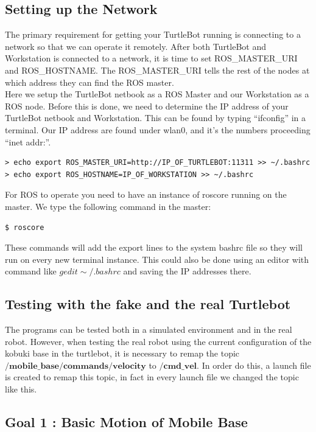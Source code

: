 \documentclass[10pt,a4paper]{article}
\begin{document}
\subsection{Setting up the Network}

The primary requirement for getting your TurtleBot running is connecting to a network so that we can operate it remotely. After both TurtleBot and Workstation is connected to a network, it is time to set ROS\_MASTER\_URI and ROS\_HOSTNAME. The ROS\_MASTER\_URI tells the rest of the nodes at which address they can find the ROS master.\\

Here we setup the TurtleBot netbook as a ROS Master and our Workstation as a ROS node. Before this is done, we need to determine the IP address of your TurtleBot netbook and Workstation. This can be found by typing ``ifconfig'' in a terminal. Our IP address are found under wlan0, and it's the numbers proceeding ``inet addr:''.

\begin{lstlisting}[frame=single] 
> echo export ROS_MASTER_URI=http://IP_OF_TURTLEBOT:11311 >> ~/.bashrc
> echo export ROS_HOSTNAME=IP_OF_WORKSTATION >> ~/.bashrc
\end{lstlisting}
For ROS to operate you need to have an instance of roscore running on the master. We type the following command in the master:

\begin{lstlisting}[frame=single] 
$ roscore
\end{lstlisting}
These commands will add the export lines to the system bashrc file so they will run on every new terminal instance. This could also be done using an editor with command like $gedit \sim/.bashrc$ and saving the IP addresses there.

\subsection{Testing with the fake and the real Turtlebot}
The programs can be tested both in a simulated environment and in the real robot. However, when testing the real robot using the current configuration of the kobuki base in the turtlebot, it is necessary to remap the topic $\textbf{/mobile\_base/commands/velocity}$ to $/\textbf{cmd\_vel}$. In order do this, a launch file is created to remap this topic, in fact in every launch file we changed the topic like this.

\subsection{Goal 1 : Basic Motion of Mobile Base}
\end{document}
